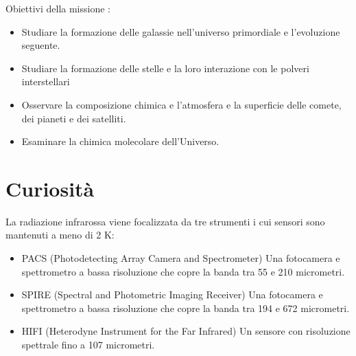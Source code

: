 \documentclass[12pt,a4paper]{article}
\begin{document}
Obiettivi della missione : 

\begin{itemize}
\item Studiare la formazione delle galassie nell'universo primordiale e l'evoluzione seguente.

\item Studiare la formazione delle stelle e la loro interazione con le polveri interstellari

\item Osservare la composizione chimica e l'atmosfera e la superficie delle comete, dei pianeti e dei satelliti.

\item Esaminare la chimica molecolare dell'Universo.

\end{itemize}

\section{Curiosità}
\label{curiosit}

La radiazione infrarossa viene focalizzata da tre strumenti i cui sensori sono mantenuti a meno di 2 K:

\begin{itemize}
\item PACS (Photodetecting Array Camera and Spectrometer)
Una fotocamera e spettrometro a bassa risoluzione che copre la banda tra 55 e 210 micrometri.

\item SPIRE (Spectral and Photometric Imaging Receiver)
Una fotocamera e spettrometro a bassa risoluzione che copre la banda tra 194 e 672 micrometri. 

\item HIFI (Heterodyne Instrument for the Far Infrared)
Un sensore con risoluzione spettrale fino a 107 micrometri. 

\end{itemize}
\end{document}
